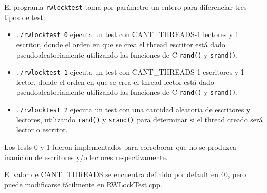 \par El programa \texttt{rwlocktest} toma por parámetro un entero para diferenciar tres tipos de test:

\begin{itemize}

\item {\texttt{./rwlocktest 0} ejecuta un test con CANT\_THREADS-1 lectores y 1 escritor, donde el orden en que se crea el thread escritor está dado pseudoaleatoriamente utilizando las funciones de C \texttt{rand()} y \texttt{srand()}.}

\item {\texttt{./rwlocktest 1} ejecuta un test con CANT\_THREADS-1 escritores y 1 lector, donde el orden en que se crea el thread lector está dado pseudoaleatoriamente utilizando las funciones de C \texttt{rand()} y \texttt{srand()}.}

\item {\texttt{./rwlocktest 2} ejecuta un test con una cantidad aleatoria de escritores y lectores, utilizando \texttt{rand()} y \texttt{srand()} para determinar si el thread creado será lector o escritor.}

\end{itemize}

\par Los tests 0 y 1 fueron implementados para corroborar que no se produzca inanición de escritores y/o lectores respectivamente. 
\par El valor de CANT\_THREADS se encuentra definido por default en 40, pero puede modificarse fácilmente en RWLockTest.cpp.


